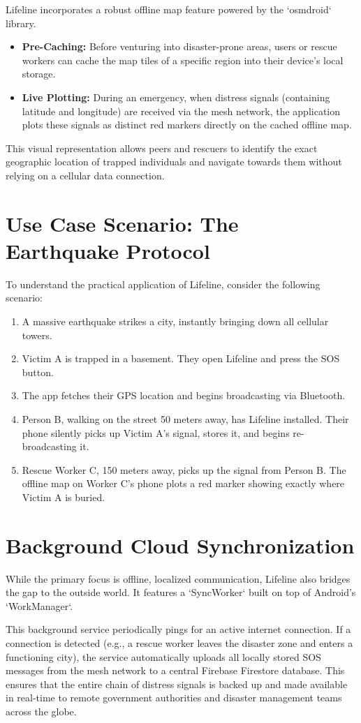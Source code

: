 Lifeline incorporates a robust offline map feature powered by the `osmdroid` library. 
\begin{itemize}
    \item \textbf{Pre-Caching:} Before venturing into disaster-prone areas, users or rescue workers can cache the map tiles of a specific region into their device's local storage.
    \item \textbf{Live Plotting:} During an emergency, when distress signals (containing latitude and longitude) are received via the mesh network, the application plots these signals as distinct red markers directly on the cached offline map. 
\end{itemize}
This visual representation allows peers and rescuers to identify the exact geographic location of trapped individuals and navigate towards them without relying on a cellular data connection.

\section{Use Case Scenario: The Earthquake Protocol}
To understand the practical application of Lifeline, consider the following scenario:
\begin{enumerate}
    \item A massive earthquake strikes a city, instantly bringing down all cellular towers.
    \item Victim A is trapped in a basement. They open Lifeline and press the SOS button.
    \item The app fetches their GPS location and begins broadcasting via Bluetooth.
    \item Person B, walking on the street 50 meters away, has Lifeline installed. Their phone silently picks up Victim A's signal, stores it, and begins re-broadcasting it.
    \item Rescue Worker C, 150 meters away, picks up the signal from Person B. The offline map on Worker C's phone plots a red marker showing exactly where Victim A is buried.
\end{enumerate}

\section{Background Cloud Synchronization}
While the primary focus is offline, localized communication, Lifeline also bridges the gap to the outside world. It features a `SyncWorker` built on top of Android's `WorkManager`. 

This background service periodically pings for an active internet connection. If a connection is detected (e.g., a rescue worker leaves the disaster zone and enters a functioning city), the service automatically uploads all locally stored SOS messages from the mesh network to a central Firebase Firestore database. This ensures that the entire chain of distress signals is backed up and made available in real-time to remote government authorities and disaster management teams across the globe.